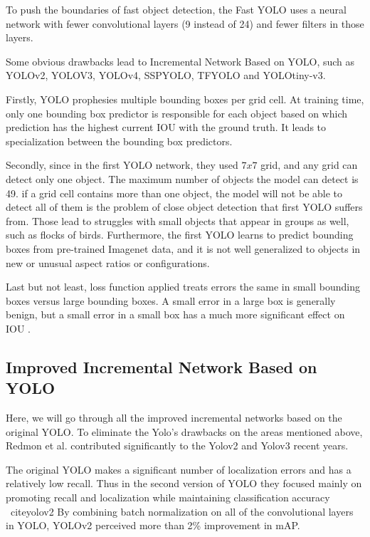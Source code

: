 
To push the boundaries of fast object detection, the  Fast YOLO \cite{yolov1} uses a neural network with fewer convolutional layers (9 instead of 24) and fewer filters in those layers.

Some obvious drawbacks lead to Incremental Network Based on YOLO, such as YOLOv2, YOLOV3, YOLOv4, SSPYOLO, TFYOLO and YOLOtiny-v3.

Firstly, YOLO prophesies multiple bounding boxes per grid cell. At training time, only one bounding box predictor is responsible for each object based on which prediction has the highest current IOU with the ground truth. It leads to specialization between the bounding box predictors.

Secondly, since in the first YOLO network, they used $7x7$ grid, and any grid can detect only one object. The maximum number of objects the model can detect is 49. if a grid cell contains more than one object, the model will not be able to detect all of them is the problem of close object detection that first YOLO suffers from. Those lead to struggles with small objects that appear in groups as well, such as flocks of birds. Furthermore, the first YOLO  learns to predict bounding boxes from pre-trained Imagenet data, and it is not well generalized to objects in new or unusual aspect ratios or configurations. 

Last but not least, loss function applied treats errors the same in small bounding boxes versus large bounding boxes. A small error in a large box is generally benign, but a small error in a small box has a much more significant effect on IOU \cite{yolov1}.



\subsection{ Improved Incremental Network Based on YOLO }


Here, we will go through all the improved incremental networks based on the original YOLO. To eliminate the Yolo's drawbacks on the areas mentioned above, Redmon et al. contributed significantly to the Yolov2 \cite{ yolov2} and Yolov3 \cite{yolov3} recent years. 

The original YOLO makes a signiﬁcant number of localization errors and has a relatively low recall. Thus in the second version of YOLO they focused mainly on promoting recall and localization while maintaining classiﬁcation accuracy \ cite{yolov2} 
By combining batch normalization on all of the convolutional layers in YOLO,  YOLOv2 perceived more than 2\% improvement in mAP.

